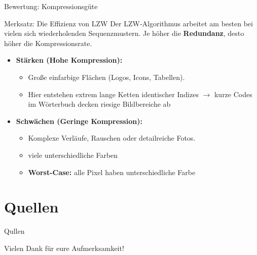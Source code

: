 \documentclass[aspectratio=169]{beamer}
\begin{document}
\begin{frame}{Bewertung: Kompressionsgüte}
    \begin{block}{Merksatz: Die Effizienz von LZW}
        Der LZW-Algorithmus arbeitet am besten bei vielen sich wiederholenden Sequenzmustern. Je höher die \textbf{Redundanz}, desto höher die Kompressionsrate.
    \end{block}

    \vspace{0.5cm}

    \begin{itemize}
        \item \textbf{Stärken (Hohe Kompression):}
        \begin{itemize}
            \item Große einfarbige Flächen (Logos, Icons, Tabellen).
            \item Hier entstehen extrem lange Ketten identischer Indizes $\rightarrow$ kurze Codes im Wörterbuch decken riesige Bildbereiche ab
        \end{itemize}
        \item \textbf{Schwächen (Geringe Kompression):}
        \begin{itemize}
            \item Komplexe Verläufe, Rauschen oder detailreiche Fotos.
            \item viele unterschiedliche Farben
            \item \textbf{Worst-Case:} alle Pixel haben unterschiedliche Farbe
        \end{itemize}
    \end{itemize}
\end{frame}


\section*{Quellen}
\begin{frame}[allowframebreaks]{Qullen}
    \printbibliography
\end{frame}

\begin{frame}
    \centering
    \Huge Vielen Dank für eure Aufmerksamkeit!
\end{frame}
\end{document}
